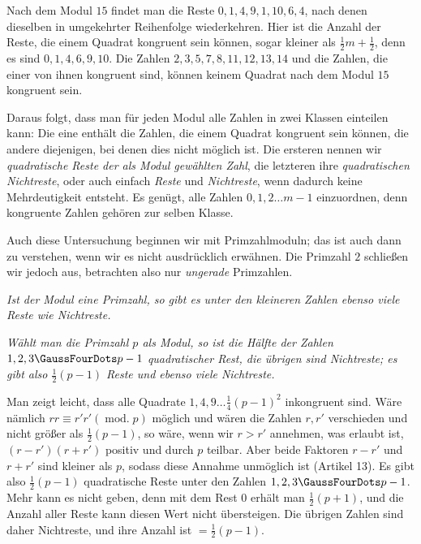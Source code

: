 Nach dem Modul $15$ findet man die Reste $0,1,4,9,1,10,6,4$, nach denen dieselben in umgekehrter Reihenfolge wiederkehren. Hier ist die Anzahl der Reste, die einem Quadrat kongruent sein können, sogar kleiner als $\tfrac12m+\tfrac12$, denn es sind $0,1,4,6,9,10$. Die Zahlen $2,3,5,7,8,11,12,13,14$ und die Zahlen, die einer von ihnen kongruent sind, können keinem Quadrat nach dem Modul $15$ kongruent sein.

Daraus folgt, dass man für jeden Modul alle Zahlen in zwei Klassen einteilen kann: Die eine enthält die Zahlen, die einem Quadrat kongruent sein können, die andere diejenigen, bei denen dies nicht möglich ist. Die ersteren nennen wir \emph{quadratische Reste der als Modul gewählten Zahl}, die letzteren ihre \emph{quadratischen Nichtreste}, oder auch einfach \emph{Reste} und \emph{Nichtreste}, wenn dadurch keine Mehrdeutigkeit entsteht. Es genügt, alle Zahlen $0,1,2\ldots m-1$ einzuordnen, denn kongruente Zahlen gehören zur selben Klasse.

Auch diese Untersuchung beginnen wir mit Primzahlmoduln; das ist auch dann zu verstehen, wenn wir es nicht ausdrücklich erwähnen. Die Primzahl $2$ schließen wir jedoch aus, betrachten also nur \emph{ungerade} Primzahlen.

\begin{center}\small\emph{Ist der Modul eine Primzahl, so gibt es unter den kleineren Zahlen ebenso viele Reste wie Nichtreste.}\end{center}

\emph{Wählt man die Primzahl $p$ als Modul, so ist die Hälfte der Zahlen $1,2,3\GaussFourDots p-1$ quadratischer Rest, die übrigen sind Nichtreste; es gibt also $\tfrac12(p-1)$ Reste und ebenso viele Nichtreste.}

Man zeigt leicht, dass alle Quadrate $1,4,9\ldots\tfrac14(p-1)^2$ inkongruent sind. Wäre nämlich $rr\equiv r'r'(\operatorname{mod.}p)$ möglich und wären die Zahlen $r,r'$ verschieden und nicht größer als $\tfrac12(p-1)$, so wäre, wenn wir $r>r'$ annehmen, was erlaubt ist, $(r-r')(r+r')$ positiv und durch $p$ teilbar. Aber beide Faktoren $r-r'$ und $r+r'$ sind kleiner als $p$, sodass diese Annahme unmöglich ist (Artikel 13). Es gibt also $\tfrac12(p-1)$ quadratische Reste unter den Zahlen $1,2,3\GaussFourDots p-1$. Mehr kann es nicht geben, denn mit dem Rest $0$ erhält man $\tfrac12(p+1)$, und die Anzahl aller Reste kann diesen Wert nicht übersteigen. Die übrigen Zahlen sind daher Nichtreste, und ihre Anzahl ist $=\tfrac12(p-1)$.

